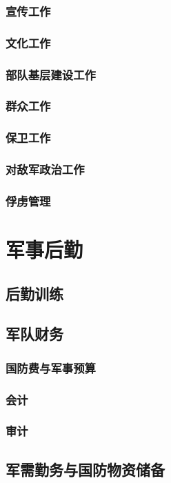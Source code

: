 \documentclass[UTF8]{../ApplicationUniverse}
\begin{document}
    \subsubsection{宣传工作}
    \subsubsection{文化工作}
    \subsubsection{部队基层建设工作}
    \subsubsection{群众工作}
    \subsubsection{保卫工作}
    \subsubsection{对敌军政治工作}
    \subsubsection{俘虏管理}
\section{军事后勤}
    \subsection{后勤训练}
    \subsection{军队财务}
        \subsubsection{国防费与军事预算}
        \subsubsection{会计}
        \subsubsection{审计}
    \subsection{军需勤务与国防物资储备}
\end{document}
